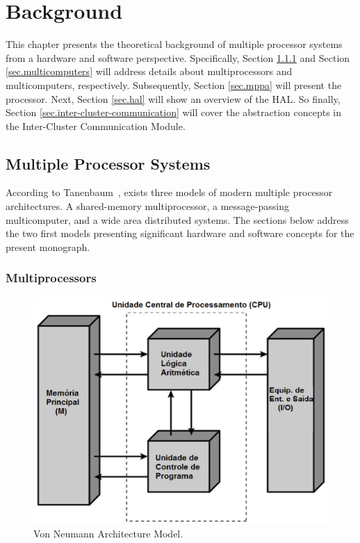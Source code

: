 \chapter{Background}
\label{ch.fundamentation}

	This chapter presents the theoretical background of multiple processor
	systems from a hardware and software perspective.
	Specifically, Section \ref{sec.multiprocessors} and Section \ref{sec.multicomputers}
	will address details about multiprocessors and multicomputers, respectively.
	Subsequently, Section \ref{sec.mppa} will present the \mppa processor.
	Next, Section \ref{sec.hal} will show an overview of the HAL.
	So finally, Section \ref{sec.inter-cluster-communication} will cover the abstraction
	concepts in the Inter-Cluster Communication Module.


\section{Multiple Processor Systems}
\label{sec.multiple-processor-systems}

	According to Tanenbaum~\cite{tanenbaum:4ed}, exists three models of modern
	multiple processor architectures.
	A shared-memory multiprocessor, a message-passing multicomputer, and a wide
	area distributed systems.
	The sections below address the two first models presenting significant
	hardware and software concepts for the present monograph.

	\subsection{Multiprocessors}
	\label{sec.multiprocessors}

		\begin{figure}[h]
			\centering
			\includegraphics[width=.6\textwidth]{images/neumann.jpg}

			\caption{
				Von Neumann Architecture Model.
			}\par
			\label{fig.neumann}
		\end{figure}

